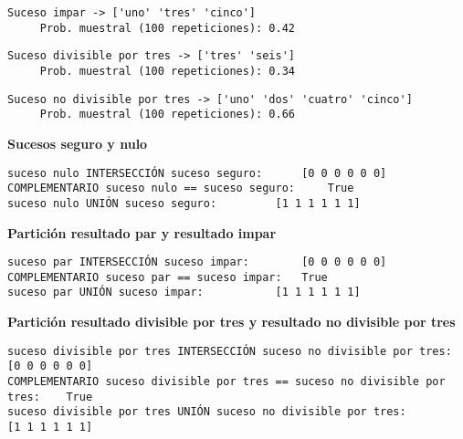 \documentclass[11pt]{article}
\begin{document}
    \begin{Verbatim}[commandchars=\\\{\}]
Suceso impar -> ['uno' 'tres' 'cinco'] 
	 Prob. muestral (100 repeticiones): 0.42

    \end{Verbatim}

    \begin{Verbatim}[commandchars=\\\{\}]
Suceso divisible por tres -> ['tres' 'seis'] 
	 Prob. muestral (100 repeticiones): 0.34

    \end{Verbatim}

    \begin{Verbatim}[commandchars=\\\{\}]
Suceso no divisible por tres -> ['uno' 'dos' 'cuatro' 'cinco'] 
	 Prob. muestral (100 repeticiones): 0.66

    \end{Verbatim}

    \textbf{Sucesos seguro y nulo}

    \begin{Verbatim}[commandchars=\\\{\}]
suceso nulo INTERSECCIÓN suceso seguro: 	 [0 0 0 0 0 0]
COMPLEMENTARIO suceso nulo == suceso seguro: 	 True
suceso nulo UNIÓN suceso seguro: 		 [1 1 1 1 1 1]

    \end{Verbatim}

    \textbf{Partición resultado par y resultado impar}

    \begin{Verbatim}[commandchars=\\\{\}]
suceso par INTERSECCIÓN suceso impar: 		 [0 0 0 0 0 0]
COMPLEMENTARIO suceso par == suceso impar: 	 True
suceso par UNIÓN suceso impar: 			 [1 1 1 1 1 1]

    \end{Verbatim}

    \textbf{Partición resultado divisible por tres y resultado no divisible
por tres}

    \begin{Verbatim}[commandchars=\\\{\}]
suceso divisible por tres INTERSECCIÓN suceso no divisible por tres:	 [0 0 0 0 0 0]
COMPLEMENTARIO suceso divisible por tres == suceso no divisible por tres: 	 True
suceso divisible por tres UNIÓN suceso no divisible por tres: 		 [1 1 1 1 1 1]

    \end{Verbatim}
\end{document}
